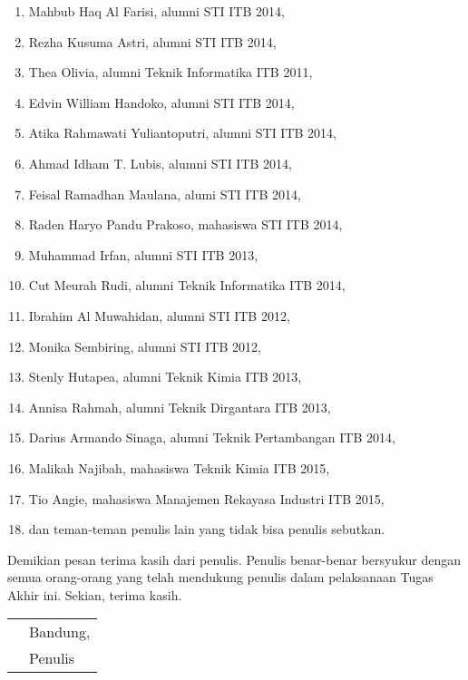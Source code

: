\begin{enumerate}
    \item Mahbub Haq Al Farisi, alumni STI ITB 2014,
    \item Rezha Kusuma Astri, alumni STI ITB 2014,
    \item Thea Olivia, alumni Teknik Informatika ITB 2011,
    \item Edvin William Handoko, alumni STI ITB 2014,
    \item Atika Rahmawati Yuliantoputri, alumni STI ITB 2014,
    \item Ahmad Idham T. Lubis, alumni STI ITB 2014,
    \item Feisal Ramadhan Maulana, alumi STI ITB 2014,
    \item Raden Haryo Pandu Prakoso, mahasiswa STI ITB 2014,
    \item Muhammad Irfan, alumni STI ITB 2013,
    \item Cut Meurah Rudi, alumni Teknik Informatika ITB 2014,
    \item Ibrahim Al Muwahidan, alumni STI ITB 2012,
    \item Monika Sembiring, alumni STI ITB 2012,
    \item Stenly Hutapea, alumni Teknik Kimia ITB 2013,
    \item Annisa Rahmah, alumni Teknik Dirgantara ITB 2013,
    \item Darius Armando Sinaga, alumni Teknik Pertambangan ITB 2014,
    \item Malikah Najibah, mahasiswa Teknik Kimia ITB 2015,
    \item Tio Angie, mahasiswa Manajemen Rekayasa Industri ITB 2015,
    \item dan teman-teman penulis lain yang tidak bisa penulis sebutkan.
\end{enumerate}

Demikian pesan terima kasih dari penulis. Penulis benar-benar bersyukur dengan semua orang-orang yang telah mendukung penulis dalam pelaksanaan Tugas Akhir ini. Sekian, terima kasih.

\vspace{15mm}
\begin{tabularx}{\textwidth}{l@{\hskip 0.5\textwidth}l}
    & Bandung, \thedate{} \yearsidang{}\\
    & Penulis
\end{tabularx}